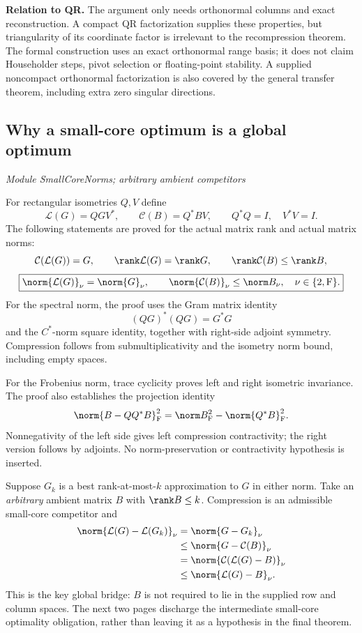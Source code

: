 \textbf{Relation to QR.} The argument only needs orthonormal columns and exact reconstruction. A compact QR factorization supplies these properties, but triangularity of its coordinate factor is irrelevant to the recompression theorem. The formal construction uses an exact orthonormal range basis; it does not claim Householder steps, pivot selection or floating-point stability. A supplied noncompact orthonormal factorization is also covered by the general transfer theorem, including extra zero singular directions.



\subsection{Why a small-core optimum is a global optimum}\label{supp6:subsection:002}\textit{Module SmallCoreNorms; arbitrary ambient competitors}\par
For rectangular isometries $Q,V$ define
\[
\mathcal L(G)=QGV^*,\qquad \mathcal C(B)=Q^*BV,
\qquad Q^*Q=I,\quad V^*V=I.
\]
The following statements are proved for the actual matrix rank and actual matrix norms:
\[
\mathcal C(\mathcal L(G))=G,
\qquad \rank\mathcal L(G)=\rank G,
\qquad \rank\mathcal C(B)\leq\rank B,
\]
\[
\boxed{\norm{\mathcal L(G)}_\nu=\norm{G}_\nu,
\qquad \norm{\mathcal C(B)}_\nu\leq\norm B_\nu,
\quad \nu\in\{2,\mathrm F\}.}
\]
For the spectral norm, the proof uses the Gram matrix identity
\[
(QG)^*(QG)=G^*G
\]
and the $C^*$-norm square identity, together with right-side adjoint symmetry. Compression follows from submultiplicativity and the isometry norm bound, including empty spaces.

For the Frobenius norm, trace cyclicity proves left and right isometric invariance. The proof also establishes the projection identity
\[
\norm{B-QQ^*B}_{\mathrm F}^{2}
=\norm B_{\mathrm F}^{2}-\norm{Q^*B}_{\mathrm F}^{2}.
\]
Nonnegativity of the left side gives left compression contractivity; the right version follows by adjoints. No norm-preservation or contractivity hypothesis is inserted.

Suppose $G_k$ is a best rank-at-most-$k$ approximation to $G$ in either norm. Take an \emph{arbitrary} ambient matrix $B$ with $\rank B\leq k$. Compression is an admissible small-core competitor and
\[
\begin{aligned}
\norm{\mathcal L(G)-\mathcal L(G_k)}_\nu
&=\norm{G-G_k}_\nu\\
&\leq\norm{G-\mathcal C(B)}_\nu\\
&=\norm{\mathcal C(\mathcal L(G)-B)}_\nu\\
&\leq\norm{\mathcal L(G)-B}_\nu.
\end{aligned}
\]
This is the key global bridge: $B$ is not required to lie in the supplied row and column spaces. The next two pages discharge the intermediate small-core optimality obligation, rather than leaving it as a hypothesis in the final theorem.



